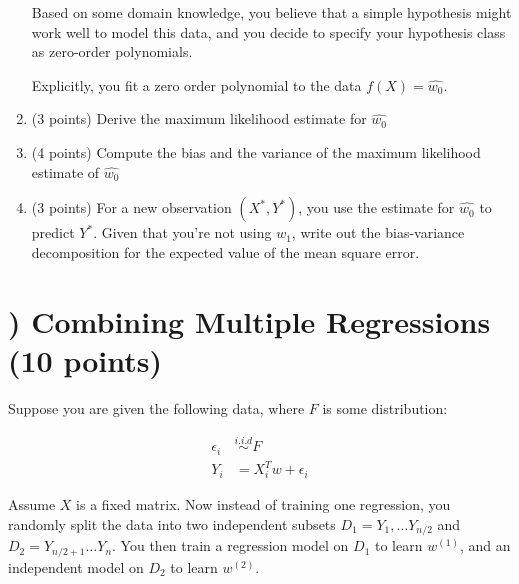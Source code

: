 \documentclass[11pt]{article}
\newcounter{QuestionCounter}
\newcounter{SubQuestionCounter}[QuestionCounter]
\newcommand{\newquestion}{\stepcounter{QuestionCounter}\setcounter{SubQuestionCounter}{1}\newpage}
\begin{document}
\begin{enumerate}[{(1)}]
Based on some domain knowledge, you believe that a simple hypothesis might work well to model this data, and you decide to specify your hypothesis class as zero-order polynomials. 

Explicitly, you fit a zero order polynomial to the data $f(X) = \hat{w_0}$. 

\item (3 points) Derive the maximum likelihood estimate for $\hat{w_0}$

\begin{answertext}{6cm}{}
    
\end{answertext} 

\item (4 points) Compute the bias and the variance of the maximum likelihood estimate of $\hat{w_0}$

\begin{answertext}{6cm}{}
    
\end{answertext} 

\item (3 points) For a new observation $(X^*, Y^*)$, you use the estimate for $\hat{w_0}$ to predict $Y^*$. Given that you're not using $w_1$, write out the bias-variance decomposition for the expected value of the mean square error.

\begin{answertext}{6cm}{}
    
\end{answertext} 

\end{enumerate}

\newquestion
\section*{) Combining Multiple Regressions (10 points)}

Suppose you are given the following data, where $F$ is some distribution:

\begin{align*}
    \epsilon_i &\stackrel{i.i.d}{\sim} F\\
    Y_i &= X_i^Tw + \epsilon_i
\end{align*}

Assume $X$ is a fixed matrix. 
Now instead of training one regression, you randomly split the data into two independent subsets $D_1 = Y_1, \dots Y_{n/2}$ and $D_2 = Y_{n/2 +1} \dots Y_n$. You then train a regression model on $D_1$ to learn $w^{(1)}$, and an independent model on $D_2$ to learn $w^{(2)}$.
\end{document}
